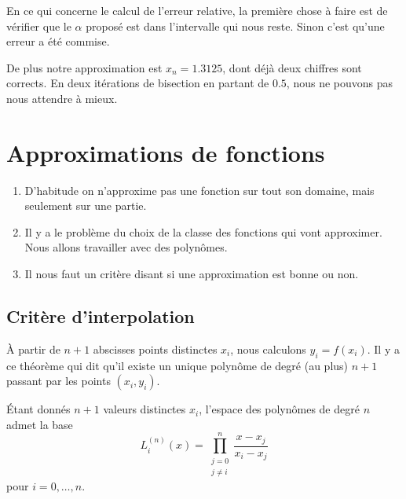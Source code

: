 \begin{example}
    En ce qui concerne le calcul de l'erreur relative, la première chose à faire est de vérifier que le \( \alpha\) proposé est dans l'intervalle qui nous reste. Sinon c'est qu'une erreur a été commise.

    De plus notre approximation est \( x_n=1.3125\), dont déjà deux chiffres sont corrects. En deux itérations de bisection en partant de \( 0.5\), nous ne pouvons pas nous attendre à mieux.
    
\end{example}


\section{Approximations de fonctions}

\begin{enumerate}
    \item
        D'habitude on n'approxime pas une fonction sur tout son domaine, mais seulement sur une partie.
    \item
        Il y a le problème du choix de la classe des fonctions qui vont approximer. Nous allons travailler avec des polynômes.
    \item
        Il nous faut un critère disant si une approximation est bonne ou non.
\end{enumerate}

\subsection{Critère d'interpolation}

À partir de \( n+1\) abscisses points distinctes \( x_i\), nous calculons \( y_i=f(x_i)\). Il y a ce théorème qui dit qu'il existe un unique polynôme de degré (au plus) \( n+1\) passant par les points \( (x_i,y_i)\).

\begin{propositionDef}
    Étant donnés \( n+1\) valeurs distinctes \( x_i\), l'espace des polynômes de degré \( n\) admet la base
    \begin{equation}
        L_i^{(n)}(x)=\prod_{\substack{j=0\\j\neq i}}^n\frac{ x-x_j }{ x_i-x_j }
    \end{equation}
    pour \( i=0,\ldots, n\).
\end{propositionDef}

